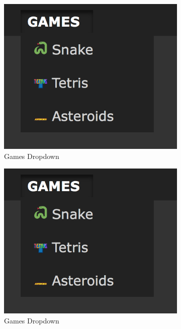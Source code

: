 \documentclass[a4paper]{article}
\begin{document}
\begin{figure}[h!]
  \centering
  \begin{subfigure}[b]{0.3\linewidth}
    \includegraphics[width=\linewidth]{images/games-dropdown.png}
    \caption{Games Dropdown}
    \label{fig:signup_default}
  \end{subfigure}
  \begin{subfigure}[b]{0.3\linewidth}
    \includegraphics[width=\linewidth]{images/games-dropdown.png}
    \caption{Games Dropdown}
    \label{fig:signup_default}
  \end{subfigure}
  \caption{}
\end{figure}
\end{document}
